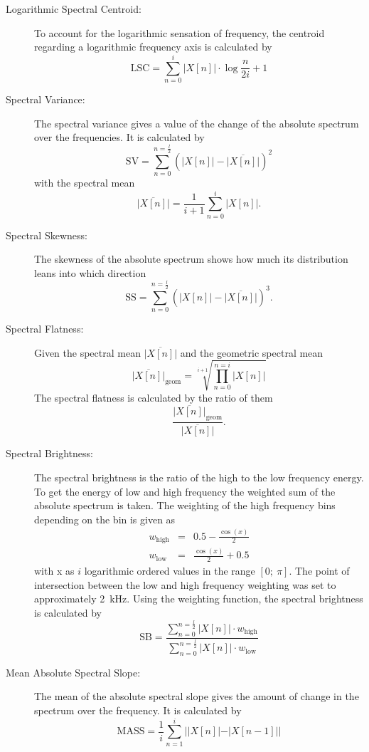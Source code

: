 \begin{description}
    \item[Logarithmic Spectral Centroid:]
        To account for the logarithmic sensation of frequency, the centroid regarding a logarithmic frequency axis is calculated by
        \[
            \mathrm{LSC} = \sum_{n=0}^{i}{|X[n]| \cdot \log{\frac{n}{2 i}+1}}
        \]
    \item[Spectral Variance:]
        The spectral variance gives a value of the change of the absolute spectrum over the frequencies. It is calculated by
        \[
            \mathrm{SV} = \sum_{n=0}^{n=\frac{l}{2}}{(|X[n]|-\overline{|X[n]|})^2}
        \]
        with the spectral mean
        \[
            \overline{|X[n]|} = \frac{1}{i+1}\sum_{n=0}^{i}{|X[n]|}.
        \]
    \item[Spectral Skewness:]
    		The skewness of the absolute spectrum shows how much its distribution leans into which direction
        \[
            \mathrm{SS} = \sum_{n=0}^{n=\frac{l}{2}}{(|X[n]|-\overline{|X[n]|})^3}.
        \]
    \item[Spectral Flatness:]
        Given the spectral mean $\overline{|X[n]|}$ and the geometric spectral mean
        \[
            \overline{|X[n]|}_\mathrm{geom} = \sqrt[i+1]{\prod_{n=0}^{n=i}{|X[n]|}}
        \]
        The spectral flatness is calculated by the ratio of them
        \[
        		\frac{\overline{|X[n]|}_\mathrm{geom}}{\overline{|X[n]|}}.
        \]
    \item[Spectral Brightness:]
        The spectral brightness is the ratio of the high to the low frequency energy. To get the energy of low and high frequency the weighted sum of the absolute spectrum is taken. The weighting of the high frequency bins depending on the bin is given as
        \begin{eqnarray*}
            w_\mathrm{high} &=& 0.5 - \frac{\cos(x)}{2}\\
            w_\mathrm{low} &=& \frac{\cos(x)}{2} + 0.5
        \end{eqnarray*}
        with x as $i$ logarithmic ordered values in the range $[0;~\pi]$. The point of intersection between the low and high frequency weighting was set to approximately 2~kHz. Using the weighting function, the spectral brightness is calculated by
        \[
            \mathrm{SB} = \frac{\sum_{n=0}^{n=\frac{l}{2}}{|X[n]|\cdot w_\mathrm{high}}}{\sum_{n=0}^{n=\frac{l}{2}}{|X[n]|\cdot w_\mathrm{low} }}
        \]
    \item[Mean Absolute Spectral Slope:]
        The mean of the absolute spectral slope gives the amount of change in the spectrum over the frequency. It is calculated by
        \[
            \mathrm{MASS} = \frac{1}{i}\sum_{n=1}^{i}{||X[n]|-|X[n-1]||}
        \]
\end{description}
